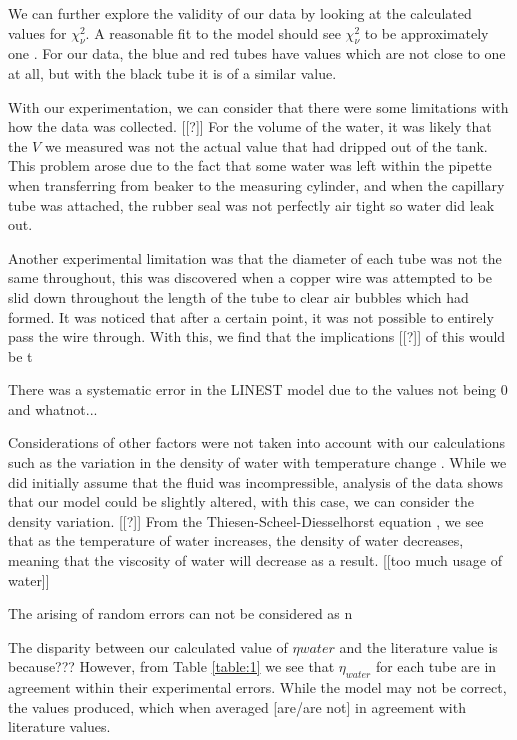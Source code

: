 \documentclass[twocolumn]{revtex4}
\begin{document}
We can further explore the validity of our data by looking at the calculated values for $\chi^2_{\nu}$. A reasonable fit to the model should see $\chi^2_{\nu}$ to be approximately one \cite{hughesandhayes}. For our data, the blue and red tubes have values which are not close to one at all, but with the black tube it is of a similar value. 

With our experimentation, we can consider that there were some limitations with how the data was collected. [[?]] For the volume of the water, it was likely that the $V$ we measured was not the actual value that had dripped out of the tank. This problem arose due to the fact that some water was left within the pipette when transferring from beaker to the measuring cylinder, and when the capillary tube was attached, the rubber seal was not perfectly air tight so water did leak out.

Another experimental limitation was that the diameter of each tube was not the same throughout, this was discovered when a copper wire was attempted to be slid down throughout the length of the tube to clear air bubbles which had formed. It was noticed that after a certain point, it was not possible to entirely pass the wire through. With this, we find that the implications [[?]] of this would be t

There was a systematic error in the LINEST model due to the values not being 0 and whatnot... 

Considerations of other factors were not taken into account with our calculations such as the variation in the density of water with temperature change \cite{dentemp}. While we did initially assume that the fluid was incompressible, analysis of the data shows that our model could be slightly altered, with this case, we can consider the density variation. [[?]] From the Thiesen-Scheel-Diesselhorst equation \cite{dentemp}, we see that as the temperature of water increases, the density of water decreases, meaning that the viscosity of water will decrease as a result. [[too much usage of water]] 

The arising of random errors can not be considered as n

The disparity between our calculated value of $\eta{water}$ and the literature value is because???
However, from Table \ref{table:1} we see that $\eta_{water}$ for each tube are in agreement within their experimental errors. While the model may not be correct, the values produced, which when averaged [are/are not] in agreement with literature values. 
\end{document}
